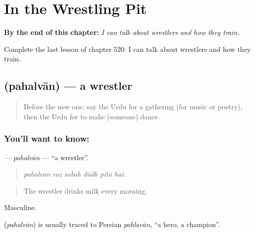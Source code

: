 
\chapter{In the Wrestling Pit}
\label{ch:ur-in-the-wrestling-pit}

\begin{chapteropening}
\textbf{By the end of this chapter:} \emph{I can talk about wrestlers and how they train.}

Complete the last lesson of chapter 520: I can talk about wrestlers and how they train.
\end{chapteropening}

\section[\texorpdfstring{\ur{پہلوان} (pahalvān)}{پہلوان (pahalvān)}]{ (pahalvān) — a wrestler}

\label{lesson:UR-C520-pahalvan}



\begin{quote}
Before the new one: say the Urdu for a gathering (for music or poetry), then the Urdu for to make (someone) dance.
\end{quote}

\subsection*{You'll want to know: }
\textbf{} — \emph{pahalvān} — \textquotedblleft{}a wrestler\textquotedblright{}.

\begin{quote}
     
\end{quote}

\begin{quote}
\emph{pahalvān roz subah dūdh pītā hai.}
\end{quote}

\begin{quote}
The wrestler drinks milk every morning.
\end{quote}

Masculine.

\begin{cousinweb}
\textbf{} (\emph{pahalvān}) is usually traced to Persian \emph{pahlavān}, \textquotedblleft{}a hero, a champion\textquotedblright{}.
\end{cousinweb}

